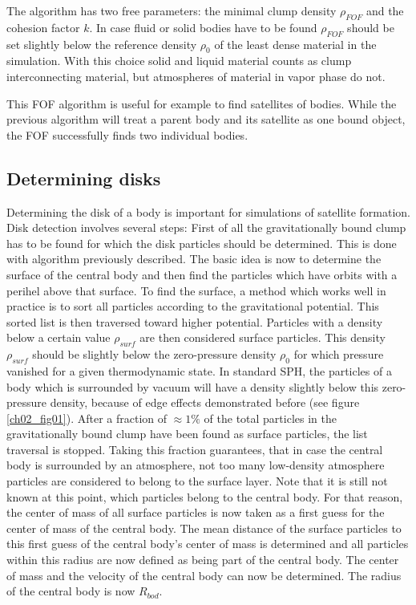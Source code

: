 The algorithm has two free parameters: the minimal clump density $\rho_{FOF}$ and the cohesion factor $k$. In case fluid or solid bodies have to be found $\rho_{FOF}$ should be set slightly below the reference density $\rho_0$ of the least dense material in the simulation. With this choice solid and liquid material counts as clump interconnecting material, but atmospheres of material in vapor phase do not.

This FOF algorithm is useful for example to find satellites of bodies. While the previous algorithm will treat a parent body and its satellite as one bound object, the FOF successfully finds two individual bodies.

\subsection{Determining disks}
Determining the disk of a body is important for simulations of satellite formation. Disk detection involves several steps:  First of all the gravitationally bound clump has to be found for which the disk particles should be determined. This is done with algorithm previously described.
The basic idea is now to determine the surface of the central body and then find the particles which have orbits with a perihel above that surface. To find the surface, a method which works well in practice is to sort all particles according to the gravitational potential. This sorted list is then traversed toward higher potential. Particles with a density below a certain value $\rho_{surf}$ are then considered surface particles. This density $\rho_{surf}$ should be slightly below the zero-pressure density $\rho_0$ for which pressure vanished for a given thermodynamic state. In standard SPH, the particles of a body which is surrounded by vacuum will have a density slightly below this zero-pressure density, because of edge effects demonstrated before  (see figure \ref{ch02_fig01}). After a fraction of $\approx 1\%$ of the total particles in the gravitationally bound clump have been found as surface particles, the list traversal is stopped. Taking this fraction guarantees, that in case the central body is surrounded by an atmosphere, not too many low-density atmosphere particles are considered to belong to the surface layer. Note that it is still not known at this point, which particles belong to the central body. For that reason, the center of mass of all surface particles is now taken as a first guess for the center of mass of the central body. The mean distance of the surface particles to this first guess of the central body's center of mass is determined and all particles within this radius are now defined as being part of the central body. The center of mass and the velocity of the central body can now be determined. The radius of the central body is now $R_{bod}$.
